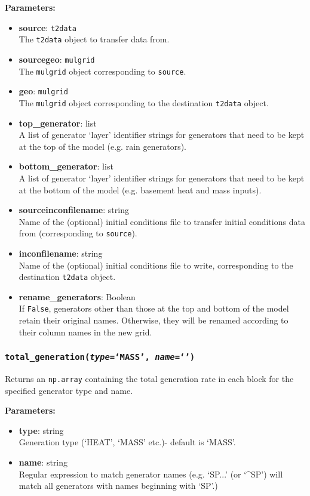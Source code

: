\textbf{Parameters:}
\begin{itemize}
\item \textbf{source}: \texttt{t2data}\\
  The \texttt{t2data} object to transfer data from.
\item \textbf{sourcegeo}: \texttt{mulgrid}\\
  The \texttt{mulgrid} object corresponding to \texttt{source}.
\item \textbf{geo}: \texttt{mulgrid}\\
  The \texttt{mulgrid} object corresponding to the destination \texttt{t2data} object.
\item \textbf{top\_generator}: list\\
  A list of generator `layer' identifier strings for generators that need to be kept at the top of the model (e.g. rain generators).
\item \textbf{bottom\_generator}: list\\
  A list of generator `layer' identifier strings for generators that need to be kept at the bottom of the model (e.g. basement heat and mass inputs).
\item \textbf{sourceinconfilename}: string\\
  Name of the (optional) initial conditions file to transfer initial conditions data from (corresponding to \texttt{source}).
\item \textbf{inconfilename}: string\\
  Name of the (optional) initial conditions file to write, corresponding to the destination \texttt{t2data} object.
\item \textbf{rename\_generators}: Boolean\\
  If \texttt{False}, generators other than those at the top and bottom of the model retain their original names.  Otherwise, they will be renamed according to their column names in the new grid.
\end{itemize}

\subsubsection{\texttt{total\_generation(\emph{type}=`MASS', \emph{name}=`')}}

Returns an \texttt{np.array} containing the total generation rate in each block for the specified generator type and name.

\textbf{Parameters:}
\begin{itemize}
\item \textbf{type}: string\\
  Generation type (`HEAT', `MASS' etc.)- default is `MASS'.
\item \textbf{name}: string\\
  Regular expression to match generator names (e.g. `SP...' (or `\^{}SP') will match all generators with names beginning with `SP'.)
\end{itemize}

